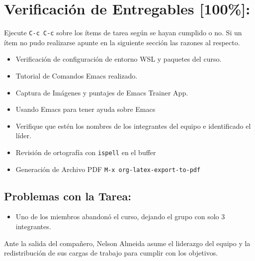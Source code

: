 \documentclass{article}
\begin{document}
\section{Verificación de Entregables [100\%]:}
\label{sec:org3ab858a}
Ejecute \texttt{C-c C-c} sobre los ítems de tarea según se hayan cumplido o
no. Si un ítem no pudo realizarse apunte en la siguiente sección las
razones al respecto.
\begin{itemize}
\item[{$\boxtimes$}] Verificación de configuración de entorno WSL y paquetes del curso.
\item[{$\boxtimes$}] Tutorial de Comandos Emacs realizado.
\item[{$\boxtimes$}] Captura de Imágenes y puntajes de Emacs Trainer App.
\item[{$\boxtimes$}] Usando Emacs para tener ayuda sobre Emacs
\item[{$\boxtimes$}] Verifique que estén los nombres de los integrantes del equipo e
identificado el líder.
\item[{$\boxtimes$}] Revisión de ortografía con \texttt{ispell} en el buffer
\item[{$\boxtimes$}] Generación de Archivo PDF \texttt{M-x org-latex-export-to-pdf}
\end{itemize}
\subsection{Problemas con la Tarea:}
\label{sec:org8a67dcc}
\begin{itemize}
\item Uno de los miembros abandonó el curso, dejando el grupo con solo 3 integrantes.
\end{itemize}
Ante la salida del compañero, Nelson Almeida asume el liderazgo del equipo y la redistribución de sus cargas de trabajo para cumplir con los objetivos.
\end{document}
